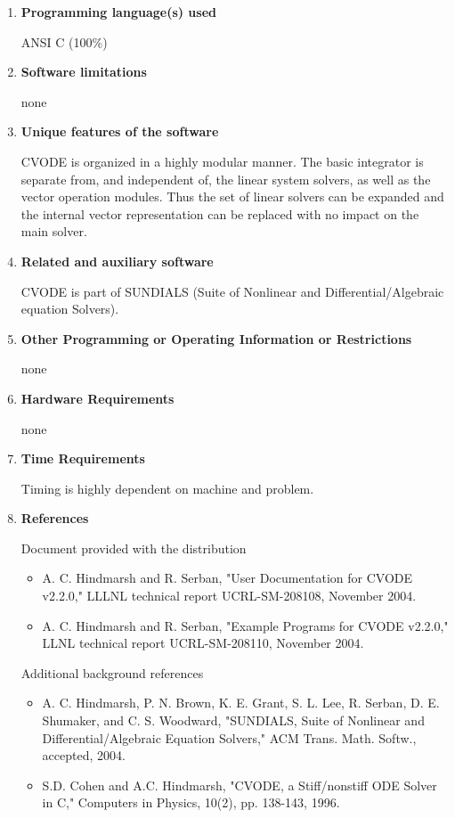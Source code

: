 \documentclass[12pt]{letter}
\begin{document}
\begin{letter}
\begin{enumerate}
\item {\bf Programming language(s) used}

ANSI C (100\%)

\item {\bf Software limitations}

none

\item {\bf Unique features of the software}

CVODE is organized in a highly modular manner. The basic integrator
is separate from, and independent of, the linear system 
solvers, as well as the vector operation modules. Thus the set of linear solvers can be 
expanded and the internal vector representation can be replaced with no impact on 
the main solver.


\item {\bf Related and auxiliary software}

CVODE is part of SUNDIALS (Suite of Nonlinear and Differential/Algebraic equation 
Solvers). 

\item {\bf Other Programming or Operating Information or Restrictions}

none


\item {\bf Hardware Requirements}

none


\item {\bf Time Requirements}

Timing is highly dependent on machine and problem.


\item {\bf References}

Document provided with the distribution
\begin{itemize}
\item A. C. Hindmarsh and R. Serban, "User Documentation for CVODE v2.2.0," 
      LLLNL technical report UCRL-SM-208108, November 2004.
\item A. C. Hindmarsh and R. Serban, "Example Programs for CVODE v2.2.0," 
    LLNL technical report UCRL-SM-208110, November 2004.
\end{itemize}
Additional background references
\begin{itemize}
\item A. C. Hindmarsh, P. N. Brown, K. E. Grant, S. L. Lee, R. Serban, 
    D. E. Shumaker, and C. S. Woodward, "SUNDIALS, Suite of Nonlinear and 
    Differential/Algebraic Equation Solvers," ACM Trans. Math. Softw., 
    accepted, 2004.
\item S.D. Cohen and A.C. Hindmarsh, "CVODE, a Stiff/nonstiff ODE Solver in C,"
    Computers in Physics, 10(2), pp. 138-143, 1996.
\end{itemize}
\end{enumerate}

\end{letter}
\end{document}
